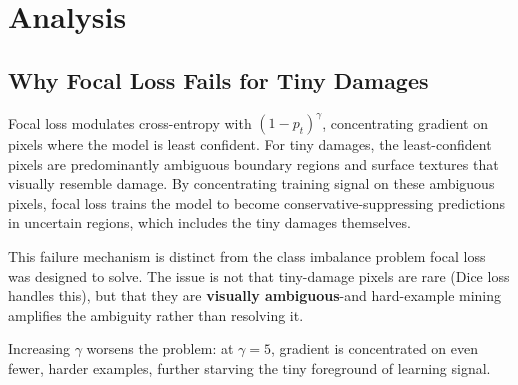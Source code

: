 \documentclass[10pt,twocolumn]{article}
\begin{document}
\begin{table}[t]
\centering
\caption{Per-category IoU breakdown (best configuration, test set).}
\label{tab:per_category}
\end{table}

\section{Analysis}
\label{sec:analysis}

\subsection{Why Focal Loss Fails for Tiny Damages}

Focal loss modulates cross-entropy with $(1-p_t)^\gamma$, concentrating gradient on pixels where the model is least confident. For tiny damages, the least-confident pixels are predominantly ambiguous boundary regions and surface textures that visually resemble damage. By concentrating training signal on these ambiguous pixels, focal loss trains the model to become conservative-suppressing predictions in uncertain regions, which includes the tiny damages themselves.

This failure mechanism is distinct from the class imbalance problem focal loss was designed to solve. The issue is not that tiny-damage pixels are rare (Dice loss handles this), but that they are \textbf{visually ambiguous}-and hard-example mining amplifies the ambiguity rather than resolving it.

Increasing $\gamma$ worsens the problem: at $\gamma=5$, gradient is concentrated on even fewer, harder examples, further starving the tiny foreground of learning signal.
\end{document}
